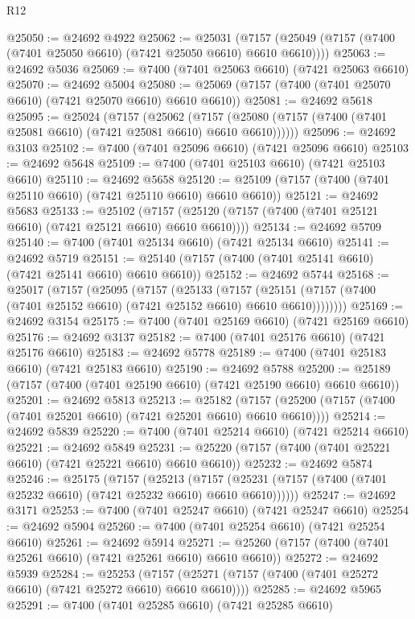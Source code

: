 \begin{lexlean}{R12}
\begin{coremodule}
{{{{{{{{{{{{{{{{{{{{{{{{{{{{{{{{{{{{{{{{{{{{{{{{{{{{{{{{{{{{{{{{{{{{{{{{{{{{{{{{{{@25050 := @24692 @4922
@25062 := @25031
    (@7157 (@25049 (@7157 (@7400 (@7401 @25050 @6610) (@7421 @25050 @6610) @6610 @6610))))
@25063 := @24692 @5036
@25069 := @7400 (@7401 @25063 @6610) (@7421 @25063 @6610)
@25070 := @24692 @5004
@25080 := @25069 (@7157 (@7400 (@7401 @25070 @6610) (@7421 @25070 @6610) @6610 @6610))
@25081 := @24692 @5618
@25095 := @25024
    (@7157
      (@25062
        (@7157 (@25080 (@7157 (@7400 (@7401 @25081 @6610) (@7421 @25081 @6610) @6610 @6610))))))
@25096 := @24692 @3103
@25102 := @7400 (@7401 @25096 @6610) (@7421 @25096 @6610)
@25103 := @24692 @5648
@25109 := @7400 (@7401 @25103 @6610) (@7421 @25103 @6610)
@25110 := @24692 @5658
@25120 := @25109 (@7157 (@7400 (@7401 @25110 @6610) (@7421 @25110 @6610) @6610 @6610))
@25121 := @24692 @5683
@25133 := @25102
    (@7157 (@25120 (@7157 (@7400 (@7401 @25121 @6610) (@7421 @25121 @6610) @6610 @6610))))
@25134 := @24692 @5709
@25140 := @7400 (@7401 @25134 @6610) (@7421 @25134 @6610)
@25141 := @24692 @5719
@25151 := @25140 (@7157 (@7400 (@7401 @25141 @6610) (@7421 @25141 @6610) @6610 @6610))
@25152 := @24692 @5744
@25168 := @25017
    (@7157
      (@25095
        (@7157
          (@25133
            (@7157
              (@25151 (@7157 (@7400 (@7401 @25152 @6610) (@7421 @25152 @6610) @6610 @6610))))))))
@25169 := @24692 @3154
@25175 := @7400 (@7401 @25169 @6610) (@7421 @25169 @6610)
@25176 := @24692 @3137
@25182 := @7400 (@7401 @25176 @6610) (@7421 @25176 @6610)
@25183 := @24692 @5778
@25189 := @7400 (@7401 @25183 @6610) (@7421 @25183 @6610)
@25190 := @24692 @5788
@25200 := @25189 (@7157 (@7400 (@7401 @25190 @6610) (@7421 @25190 @6610) @6610 @6610))
@25201 := @24692 @5813
@25213 := @25182
    (@7157 (@25200 (@7157 (@7400 (@7401 @25201 @6610) (@7421 @25201 @6610) @6610 @6610))))
@25214 := @24692 @5839
@25220 := @7400 (@7401 @25214 @6610) (@7421 @25214 @6610)
@25221 := @24692 @5849
@25231 := @25220 (@7157 (@7400 (@7401 @25221 @6610) (@7421 @25221 @6610) @6610 @6610))
@25232 := @24692 @5874
@25246 := @25175
    (@7157
      (@25213
        (@7157 (@25231 (@7157 (@7400 (@7401 @25232 @6610) (@7421 @25232 @6610) @6610 @6610))))))
@25247 := @24692 @3171
@25253 := @7400 (@7401 @25247 @6610) (@7421 @25247 @6610)
@25254 := @24692 @5904
@25260 := @7400 (@7401 @25254 @6610) (@7421 @25254 @6610)
@25261 := @24692 @5914
@25271 := @25260 (@7157 (@7400 (@7401 @25261 @6610) (@7421 @25261 @6610) @6610 @6610))
@25272 := @24692 @5939
@25284 := @25253
    (@7157 (@25271 (@7157 (@7400 (@7401 @25272 @6610) (@7421 @25272 @6610) @6610 @6610))))
@25285 := @24692 @5965
@25291 := @7400 (@7401 @25285 @6610) (@7421 @25285 @6610)
}}}}}}}}}}}}}}}}}}}}}}}}}}}}}}}}}}}}}}}}}}}}}}}}}}}}}}}}}}}}}}}}}}}}}}}}}}}}}}}}}}
\end{coremodule}
\end{lexlean}
